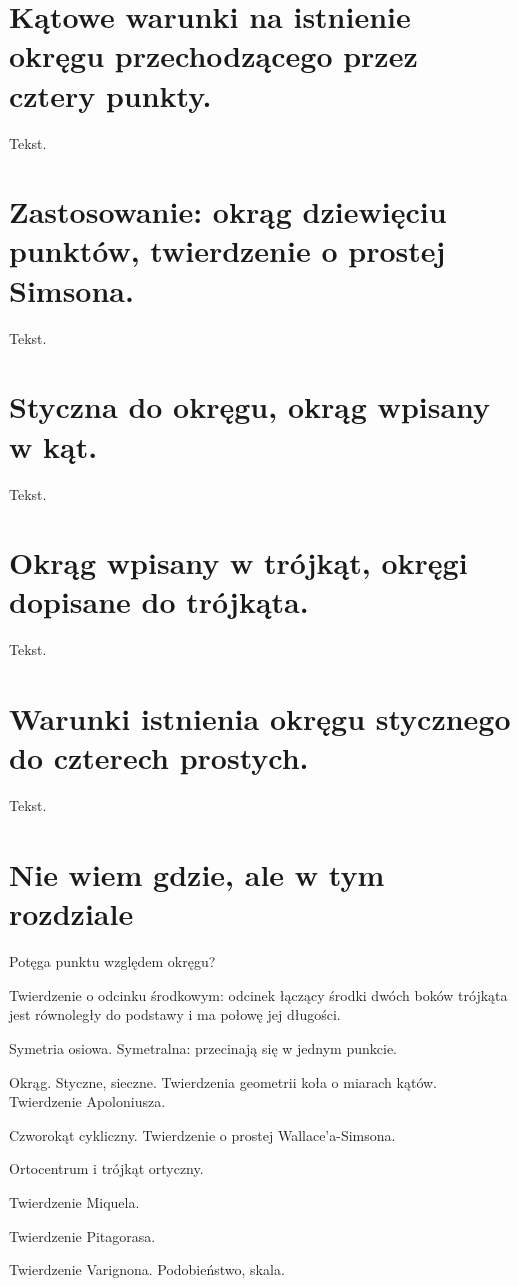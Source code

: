 \documentclass{parchment}
\begin{document}
\section{Kątowe warunki na istnienie okręgu przechodzącego przez cztery punkty.}
Tekst.

\section{Zastosowanie: okrąg dziewięciu punktów, twierdzenie o prostej Simsona.}
Tekst.

\section{Styczna do okręgu, okrąg wpisany w kąt.}
Tekst.

\section{Okrąg wpisany w trójkąt, okręgi dopisane do trójkąta.}
Tekst.

\section{Warunki istnienia okręgu stycznego do czterech prostych.}
Tekst.

\section{Nie wiem gdzie, ale w tym rozdziale}
Potęga punktu względem okręgu?


Twierdzenie o odcinku środkowym: odcinek łączący środki dwóch boków trójkąta jest równoległy do podstawy i ma połowę jej długości.

Symetria osiowa.
Symetralna: przecinają się w jednym punkcie.

Okrąg.
Styczne, sieczne.
Twierdzenia geometrii koła o miarach kątów.
Twierdzenie Apoloniusza.

Czworokąt cykliczny.
Twierdzenie o prostej Wallace'a-Simsona.

Ortocentrum i trójkąt ortyczny.

Twierdzenie Miquela.

Twierdzenie Pitagorasa.



Twierdzenie Varignona.
Podobieństwo, skala.
\end{document}
